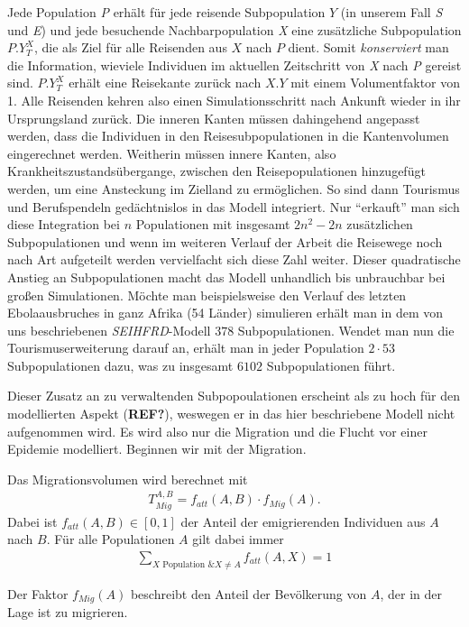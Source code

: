 Jede Population \emph{P} erhält für jede reisende Subpopulation $Y$ (in unserem Fall \emph{S} und \emph{E}) und jede besuchende Nachbarpopulation \emph{X} eine zusätzliche Subpopulation $P.Y^X_T$, die als Ziel für alle Reisenden aus $X$ nach $P$ dient. Somit \emph{konserviert} man die Information, wieviele Individuen im aktuellen Zeitschritt von \emph{X} nach \emph{P} gereist sind. $P.Y^X_T$ erhält eine Reisekante zurück nach $X.Y$ mit einem Volumentfaktor von 1. Alle Reisenden kehren also einen Simulationsschritt nach Ankunft wieder in ihr Ursprungsland zurück. Die inneren Kanten müssen dahingehend angepasst werden, dass die Individuen in den Reisesubpopulationen in die Kantenvolumen eingerechnet werden. Weitherin müssen innere Kanten, also Krankheitszustandsübergange, zwischen den Reisepopulationen hinzugefügt werden, um eine Ansteckung im Zielland zu ermöglichen. So sind dann Tourismus und Berufspendeln gedächtnislos in das Modell integriert. Nur ``erkauft'' man sich diese Integration bei $n$ Populationen mit insgesamt $2n^2-2n$ zusätzlichen Subpopulationen und wenn im weiteren Verlauf der Arbeit die Reisewege noch nach Art aufgeteilt werden vervielfacht sich diese Zahl weiter. Dieser quadratische Anstieg an Subpopulationen macht das Modell unhandlich bis unbrauchbar bei großen Simulationen. Möchte man beispielsweise den Verlauf des letzten Ebolaausbruches in ganz Afrika (54 Länder) simulieren erhält man in dem von uns beschriebenen \emph{SEIHFRD}-Modell $378$ Subpopulationen. Wendet man nun die Tourismuserweiterung darauf an, erhält man in jeder Population $2\cdot 53$ Subpopulationen dazu, was zu insgesamt $6102$ Subpopulationen führt. 

Dieser Zusatz an zu verwaltenden Subpopoulationen erscheint als zu hoch für den modellierten Aspekt (\textbf{REF?}), weswegen er in das hier beschriebene Modell nicht aufgenommen wird. Es wird also nur die Migration und die Flucht vor einer Epidemie modelliert. Beginnen wir mit der Migration. 

Das Migrationsvolumen wird berechnet mit
\begin{align}
	T^{A,B}_{Mig} = f_{att}(A,B)\cdot f_{Mig}(A).
\end{align}
Dabei ist $f_{att}(A,B) \in [0,1]$ der Anteil der emigrierenden Individuen aus $A$ nach $B$. Für alle Populationen $A$ gilt dabei immer
\begin{align}
	\sum\limits_{X \text{ Population } \& X\neq A} f_{att}(A,X) = 1
\end{align}

Der Faktor $f_{Mig}(A)$ beschreibt den Anteil der Bevölkerung von $A$, der in der Lage ist zu migrieren. 